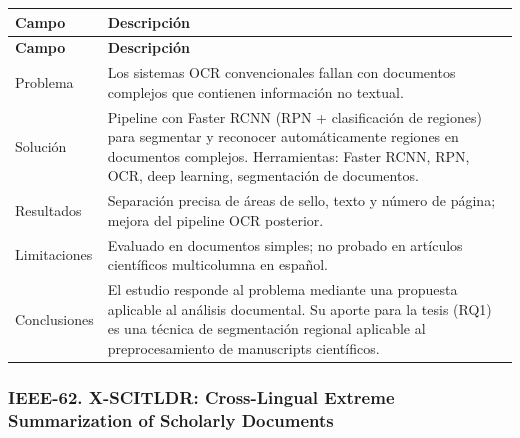 \begin{longtable}{@{}>{\raggedright\arraybackslash}p{}>{\raggedright\arraybackslash}p{}@{}}
\toprule
\textbf{Campo} & \textbf{Descripción} \\
\midrule
\endfirsthead
\toprule
\textbf{Campo} & \textbf{Descripción} \\
\midrule
\endhead
\bottomrule
\endfoot
\endlastfoot
Problema & Los sistemas OCR convencionales fallan con documentos complejos que contienen información no textual. \\
Solución & Pipeline con Faster RCNN (RPN + clasificación de regiones) para segmentar y reconocer automáticamente regiones en documentos complejos. Herramientas: Faster RCNN, RPN, OCR, deep learning, segmentación de documentos. \\
Resultados & Separación precisa de áreas de sello, texto y número de página; mejora del pipeline OCR posterior. \\
Limitaciones & Evaluado en documentos simples; no probado en artículos científicos multicolumna en español. \\
Conclusiones & El estudio responde al problema mediante una propuesta aplicable al análisis documental. Su aporte para la tesis (RQ1) es una técnica de segmentación regional aplicable al preprocesamiento de manuscripts científicos. \\
\end{longtable}

\subsubsection*{IEEE-62. X-SCITLDR: Cross-Lingual Extreme Summarization of Scholarly Documents}

